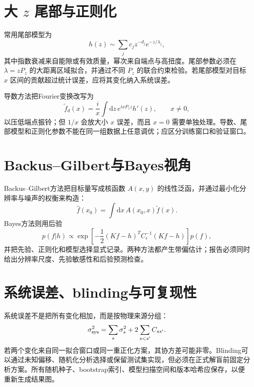 \documentclass[UTF8,12pt,a4paper,twoside,openany]{ctexbook}
\newcommand{\dd}{\mathrm{d}}
\begin{document}
\section{\texorpdfstring{大 \(z\) 尾部与正则化}{大 z 尾部与正则化}}

常用尾部模型为
\begin{equation}
  h(z)\sim\sum_j c_jz^{-d_j}e^{-z/\lambda_j},
  \label{eq:tail-model}
\end{equation}
其中指数衰减来自能隙或有效质量，幂次来自端点与高扭度。尾部参数必须在 \(\lambda=zP_z\) 的大距离区域拟合，并通过不同 \(P_z\) 的联合约束检验。若尾部模型对目标 \(x\) 区间的贡献超过统计误差，应将其变化纳入系统误差。

导数方法把Fourier变换改写为
\begin{equation}
  \widetilde f_d(x)
  =\frac{i}{x}\int\dd z\,e^{ixP_zz}h'(z),
  \qquad x\neq0,
  \label{eq:derivative-method}
\end{equation}
以压低端点振铃；但 \(1/x\) 会放大小 \(x\) 误差，而且 \(x=0\) 需要单独处理。导数、尾部模型和正则化参数不能在同一组数据上任意调优；应区分训练窗口和验证窗口。

\section{Backus--Gilbert与Bayes视角}

Backus--Gilbert方法把目标量写成核函数 \(A(x,y)\) 的线性泛函，并通过最小化分辨率与噪声的权衡来构造：
\begin{equation}
  \hat f(x_0)=\int\dd x\,A(x_0,x)\widetilde f(x).
  \label{eq:backus-gilbert}
\end{equation}
Bayes方法则用后验
\begin{equation}
  p(f|h)\propto
  \exp\left[-\frac12(Kf-h)^TC_\epsilon^{-1}(Kf-h)\right]
  p(f),
  \label{eq:bayes-inverse}
\end{equation}
并把先验、正则化和模型选择显式记录。两种方法都产生带偏估计；报告必须同时给出分辨率尺度、先验敏感性和后验预测检查。

\section{系统误差、blinding与可复现性}

系统误差不是把所有变化相加，而是按物理来源分组：
\begin{equation}
  \sigma_{\rm sys}^2
  =\sum_s\sigma_s^2+2\sum_{s<s'}C_{ss'}.
  \label{eq:systematic-cov}
\end{equation}
若两个变化来自同一拟合窗口或同一重正化方案，其协方差可能非零。Blinding可以通过未知偏移、随机化分析选择或保留测试集实现，但必须在正式解盲前固定分析方案。所有随机种子、bootstrap索引、模型扫描空间和版本哈希应保存，以便重新生成结果图。
\end{document}
